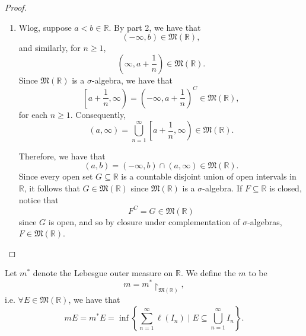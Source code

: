 \documentclass[notoc,notitlepage]{tufte-book}
\begin{document}
\begin{proof}
\begin{enumerate}
    \item Wlog, suppose $a < b \in \mathbb{R}$. By part 2, we have that
      \begin{equation*}
        (-\infty, b) \in \mathfrak{M}(\mathbb{R}),
      \end{equation*}
      and similarly, for $n \geq 1$,
      \begin{equation*}
        \left(\infty, a + \frac{1}{n}\right) \in \mathfrak{M}(\mathbb{R}).
      \end{equation*}
      Since $\mathfrak{M}(\mathbb{R})$ is a $\sigma$-algebra, we have that
      \begin{equation*}
        \left[a + \frac{1}{n}, \infty\right) = \left(-\infty, a +
        \frac{1}{n}\right)^C \in \mathfrak{M}(\mathbb{R}),
      \end{equation*}
      for each $n \geq 1$. Consequently,
      \begin{equation*}
        (a, \infty) = \bigcup_{n=1}^{\infty} \left[ a + \frac{1}{n}, \infty
        \right) \in \mathfrak{M}(\mathbb{R}).
      \end{equation*}

      Therefore, we have that
      \begin{equation*}
        (a, b) = (-\infty, b) \cap (a, \infty) \in \mathfrak{M}(\mathbb{R}).
      \end{equation*}
       Since every open set $G \subseteq
      \mathbb{R}$ is a countable disjoint union of open intervals in
      $\mathbb{R}$, it follows that $G \in \mathfrak{M}(\mathbb{R})$ since
      $\mathfrak{M}(\mathbb{R})$ is a $\sigma$-algebra.
      If $F \subseteq \mathbb{R}$ is closed, notice that
      \begin{equation*}
        F^C = G \in \mathfrak{M}(\mathbb{R})
      \end{equation*}
      since $G$ is open, and so by closure under complementation of
      $\sigma$-algebras, $F \in \mathfrak{M}(\mathbb{R})$.
  \end{enumerate}
\end{proof}

\begin{defn}\label{defn:lebesgue_measure}
  Let $m^*$ denote the Lebesgue outer measure on $\mathbb{R}$. We define the
   $m$ to be
  \begin{equation*}
    m = m^* \restriction_{\mathfrak{M}(\mathbb{R})},
  \end{equation*}
  i.e. $\forall E \in \mathfrak{M}(\mathbb{R})$, we have that
  \begin{equation*}
    m E = m^* E = \inf \left\{ \sum_{n=1}^{\infty} \ell(I_n) \mid E \subseteq
    \bigcup_{n=1}^{\infty} I_n \right\}.
  \end{equation*}
\end{defn}
\end{document}
